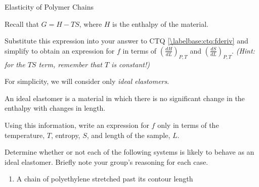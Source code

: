 \begin{activity}{Elasticity of Polymer Chains}
\begin{ctqs}
	\question Recall that $G = H - TS$, where $H$ is the enthalpy of the material.  
	
		Substitute this expression into your answer to CTQ \ref{\labelbase:ctq:fderiv} and simplify to obtain an expression for $f$ in terms of $\left(\frac{dH}{dL}\right)_{P,T}$ and $\left(\frac{dS}{dL}\right)_{P,T}$.  \emph{(Hint: for the $TS$ term, remember that $T$ is constant!)}
		
		\begin{solution}[1.5in]\end{solution}
		
		\label{\labelbase:ctq:fdSdL}
	
\end{ctqs}

\begin{infobox}
	
	For simplicity, we will consider only \emph{ideal elastomers}.
	
	An ideal elastomer is a material in which there is no significant change in the enthalpy with changes in length.
	
\end{infobox}

\begin{ctqs}

	\question Using this information, write an expression for $f$ only in terms of the temperature, $T$, entropy, $S$, and length of the sample, $L$.
		
		\begin{solution}[0.75in]\end{solution}
	
	\question Determine whether or not each of the following systems is likely to behave as an ideal elastomer.  Briefly note your group's reasoning for each case.
	
		\begin{enumerate}
			\item A chain of polyethylene stretched past its contour length
			

\end{enumerate}
\end{ctqs}
\end{activity}
